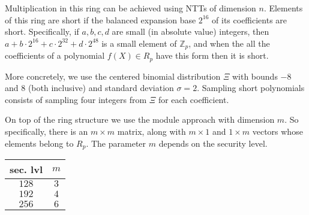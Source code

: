 Multiplication in this ring can be achieved using NTTs of dimension $n$. Elements of this ring are short if the balanced expansion base $2^{16}$ of its coefficients are short. Specifically, if $a, b, c, d$ are small  (in absolute value) integers, then $a + b \cdot 2^{16} + c \cdot 2^{32} + d \cdot 2^{48}$ is a small element of $\mathbb{Z}_p$, and when the all the coefficients of a polynomial $f(X) \in R_p$ have this form then it is short.

More concretely, we use the centered binomial distribution $\Xi$ with bounds $-8$ and $8$ (both inclusive) and standard deviation $\sigma = 2$. Sampling short polynomials consists of sampling four integers from $\Xi$ for each coefficient.

On top of the ring structure we use the module approach with dimension $m$. So specifically, there is an $m \times m$ matrix, along with $m \times 1$ and $1 \times m$ vectors whose elements belong to $R_p$. The parameter $m$ depends on the security level.

\begin{table}
\centering
\begin{tabular}{c|c}
sec. lvl & $m$ \\ \hline
$128$ & $3$ \\
$192$ & $4$ \\
$256$ & $6$
\end{tabular}
\end{table}



